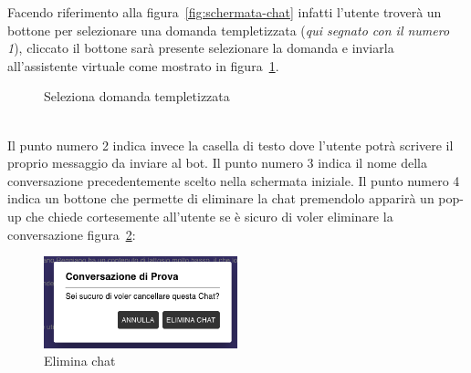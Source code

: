 Facendo riferimento alla figura~\ref{fig:schermata-chat} infatti l'utente troverà un bottone per selezionare una domanda templetizzata (\textit{qui segnato con il numero 1}), cliccato il bottone sarà presente selezionare la domanda e inviarla all'assistente virtuale come mostrato in figura~\ref{fig:domanda templetizzata}.
\begin{figure}[htbp]
    \centering
        \caption{Seleziona domanda templetizzata}
        \label{fig:domanda templetizzata}
\end{figure}
\\
Il punto numero 2 indica invece la casella di testo dove l'utente potrà scrivere il proprio messaggio da inviare al bot.
Il punto numero 3 indica il nome della conversazione precedentemente scelto nella schermata iniziale. Il punto numero 4 indica un bottone che permette di eliminare la chat premendolo apparirà un pop-up che chiede cortesemente all'utente se è sicuro di voler eliminare la conversazione figura~\ref{fig:elimina-chat}:
\begin{figure}[h!]
    \centering
    \includegraphics[width=0.5\textwidth]{./img/eliminaChat.png}
    \caption{Elimina chat}
    \label{fig:elimina-chat}
\end{figure}
